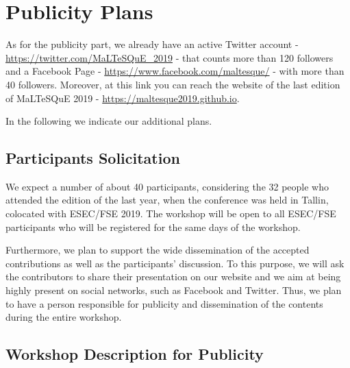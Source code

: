 
\section{Publicity Plans}

As for the publicity part, we already have an active Twitter account - \url{https://twitter.com/MaLTeSQuE_2019} - that counts more than 120 followers and a Facebook Page - \url{https://www.facebook.com/maltesque/} - with more than 40 followers.
Moreover, at this link you can reach the website of the last edition of MaLTeSQuE 2019 - \url{https://maltesque2019.github.io}.

In the following we indicate our additional plans.

\subsection{Participants Solicitation}

We expect a number of about 40 participants, considering the 32 people who attended the edition of the last year, when the conference was held in Tallin, colocated with ESEC/FSE 2019.
The workshop will be open to all ESEC/FSE participants who will be registered for the same days of the workshop.

Furthermore, we plan to support the wide dissemination of the accepted contributions as well as the participants’ discussion.
To this purpose, we will ask the contributors to share their presentation on our website and we aim at being highly present on social networks, such as Facebook and Twitter.
Thus, we plan to have a person responsible for publicity and dissemination of the contents during the entire workshop.

\subsection{Workshop Description for Publicity}

